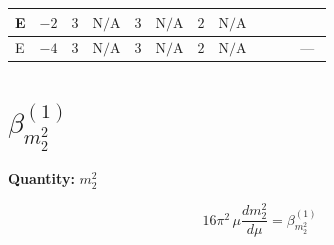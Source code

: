 \documentclass[8pt]{article}
\begin{document}
\begin{landscape}
\begin{longtable}{@{}llcccccc >{\raggedright\arraybackslash}p{0.21\linewidth} >{\raggedright\arraybackslash}p{0.21\linewidth} >{\raggedright\arraybackslash}p{0.21\linewidth}@{}}
\midrule
E & $-2$ & $3$ & $\text{N/A}$ & $3$ & $\text{N/A}$ & $2$ & $\text{N/A}$ & \scriptsize\adjustbox{max width=\linewidth}{$\begin{gathered} +{m_1^2} (8 {\lambda_{S_1}^{(1)}}+4 {\lambda_{S_1}^{(A)}})\end{gathered}$} & \scriptsize\adjustbox{max width=\linewidth}{$\begin{gathered} +{m_2^2} (6 {\lambda_{12}^{(1)}}+4 {\lambda_{12}^{(\times)}})\end{gathered}$} & \scriptsize\adjustbox{max width=\linewidth}{$\begin{gathered} 4 {\mu_{\mathrm{T3GeneralS2Sq}}} (3 \left({\lambda_{X_{7}}^{(1)}}\right)^{*}+\left({\lambda_{X_{7}}^{(2)}}\right)^{*})\end{gathered}$} \\
\midrule
E & $-4$ & $3$ & $\text{N/A}$ & $3$ & $\text{N/A}$ & $2$ & $\text{N/A}$ & \scriptsize\adjustbox{max width=\linewidth}{$\begin{gathered} +{m_1^2} (8 {\lambda_{S_1}^{(1)}}+4 {\lambda_{S_1}^{(A)}})\end{gathered}$} & \scriptsize\adjustbox{max width=\linewidth}{$\begin{gathered} +{m_2^2} (6 {\lambda_{12}^{(1)}}+4 {\lambda_{12}^{(\times)}})\end{gathered}$} & --- \\
\midrule
\bottomrule
\end{longtable}
\clearpage
\section*{$\beta_{m_2^2}^{(1)}$}
\noindent\textbf{Quantity: }$m_2^2$\par\smallskip
\[16\pi^2\,\mu\frac{d m_2^2}{d\mu}=\beta_{m_2^2}^{(1)}\]

\end{landscape}
\end{document}
